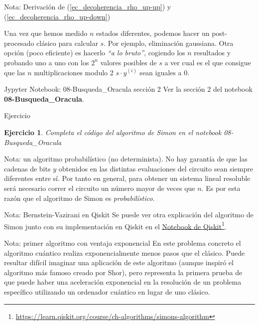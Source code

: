 \documentclass[a4paper,11pt]{book} %
\newtheorem{ejercicio_contador}{Ejercicio}
\newcommand{\Ejercicio}[1]{
		\begin{mybox_gray}{Ejercicio} 
			\begin{ejercicio_contador}
				 #1 
			\end{ejercicio_contador} 
		\end{mybox_gray}
	}
\numberwithin{equation}{chapter}
\begin{document}
\begin{mybox_blue}{Nota: Derivación de (\ref{ec_decoherencia_rho_up-up}) y  (\ref{ec_decoherencia_rho_up-down})}
\begin{itemize}
	Una vez que hemos medido $n$ estados diferentes, podemos hacer un post-procesado clásico para calcular $s$. Por ejemplo, eliminación gaussiana. Otra opción (poco eficiente) es hacerlo \textit{``a lo bruto''}, cogiendo los $n$ resultados y probando uno a uno con los $2^n$ valores posibles de $s$ a ver cual es el que consigue que las $n$ multiplicaciones modulo 2 $s \cdot y^{(i)}$ sean iguales a 0. 

\end{itemize}

	\begin{mybox_orange}{Jypyter Notebook: 08-Busqueda\_Oracula sección 2}
	Ver la sección 2 del notebook \textbf{08-Busqueda\_Oracula}.
	\end{mybox_orange}

	\Ejercicio{Completa el código del algoritmo de Simon en el notebook 08-Busqueda\_Oracula}

	\begin{mybox_blue}{Nota: un algoritmo probabilístico (no determinista).}
	No hay garantía de que las cadenas de bits $y$ obtenidos en las distintas evaluaciones del circuito sean siempre diferentes entre sí. 
	Por tanto en general, para obtener un sistema lineal resoluble será necesario correr el circuito un número mayor de veces que $n$.  
	Es por esta razón que el algoritmo de Simon es \textit{probabilístico}.
	\end{mybox_blue}

	\begin{mybox_blue}{Nota: Bernstein-Vazirani en Qiskit}
	Se puede ver otra explicación del algoritmo de  Simon junto con su implementación en Qiskit en el 
	\href{https://learn.qiskit.org/course/ch-algorithms/simons-algorithm}{Notebook de Qiskit}\footnote{\url{https://learn.qiskit.org/course/ch-algorithms/simons-algorithm}}.
	\end{mybox_blue}
	
	

	\begin{mybox_blue}{Nota: primer algoritmo con ventaja exponencial}
	En este problema concreto el algoritmo cuántico realiza exponencialmente menos pasos que el clásico. Puede resultar difícil imaginar una aplicación de este algoritmo 
	(aunque inspiró el algoritmo más famoso creado por Shor), pero representa la primera prueba de que puede haber una aceleración exponencial en la resolución de un 
	problema específico utilizando un ordenador cuántico en lugar de uno clásico.
	\end{mybox_blue}



\end{mybox_blue}
\end{document}
